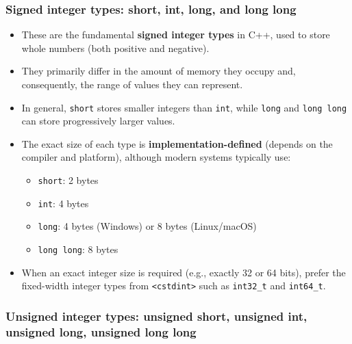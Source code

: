 \documentclass[10pt]{article}
\begin{document}
\newpage 

\subsubsection{Signed integer types: short, int, long, and long long}

\begin{itemize}
    \item These are the fundamental \textbf{signed integer types} in C++, used to store whole numbers (both positive and negative).
    \item They primarily differ in the amount of memory they occupy and, consequently, the range of values they can represent.
    \item In general, \verb|short| stores smaller integers than \verb|int|, while \verb|long| and \verb|long long| can store progressively larger values.
    \item The exact size of each type is \textbf{implementation-defined} (depends on the compiler and platform), although modern systems typically use:
    \begin{itemize}
        \item \verb|short|: 2 bytes
        \item \verb|int|: 4 bytes
        \item \verb|long|: 4 bytes (Windows) or 8 bytes (Linux/macOS)
        \item \verb|long long|: 8 bytes
    \end{itemize}
    \item When an exact integer size is required (e.g., exactly 32 or 64 bits), prefer the fixed-width integer types from \verb|<cstdint>| such as \verb|int32_t| and \verb|int64_t|.
\end{itemize}

\newpage
\subsubsection{Unsigned integer types: unsigned short, unsigned int, unsigned long, unsigned long long}
\end{document}

